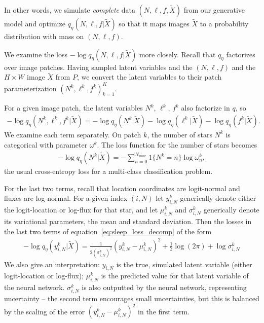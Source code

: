 In other words, we simulate {\itshape complete} data $(N, \ell, f, \tilde X)$ from our generative model and optimize $q_{\eta}(N, \ell, f | \tilde X)$ so that it maps images $\tilde X$ to a probability distribution with mass on $(N, \ell, f)$.

We examine the loss $-\log q_\eta(N, \ell, f | \tilde X)$ more closely. Recall that $q_\eta$ factorizes over image patches. Having sampled latent variables and the $(N,\ell,f)$ and the $H\times W$ image $\tilde X$ from $P$, we convert the latent variables to their patch parameterization $(N^k, \ell^k, f^k)_{k = 1}^K$. 

For a given image patch, the latent variables $N^k$, $\ell^k$, $f^k$ also factorize in $q$, so 
\begin{align}
    - \log q_\eta(N^k, \ell^k, f^k | \tilde X) = 
        - \log q_\eta(N^k | \tilde X) 
        - \log q_\eta(\ell^k | \tilde X) 
        - \log q_\eta(f^k | \tilde X). 
        \label{eq:sleep_loss_decomp}
\end{align}
We examine each term separately. On patch $k$, the number of stars $N^k$ is categorical with parameter $\omega^k$. The loss function for the number of stars becomes
\begin{align}
    - \log q_\eta(N^k | \tilde X) = -\sum_{n = 0}^{N_{max}} 1\{N^k = n\} \log \omega^k_n, 
\end{align}
the usual cross-entropy loss for a multi-class classification problem. 

For the last two terms, recall that location coordinates are logit-normal and fluxes are log-normal. For a given index $(i, N)$ let $y^k_{i,N}$ generically denote either the 
logit-location or log-flux for that star, 
and let $\mu^k_{i,N}$ and $\sigma^{k}_{i,N}$ generically denote its variational parameters,
the mean and standard deviation. Then the losses in the last two terms of equation~\ref{eq:sleep_loss_decomp}
of the form 
\begin{align}
    -\log q_\eta(y^k_{i,N} | \tilde X) = 
        \frac{1}{2(\sigma^{k}_{i,N})^2}(y^k_{i,N} - \mu^k_{i,N})^2 + \frac{1}{2}\log(2\pi) + \log\sigma^{k}_{i,N}
\end{align}
We also give an interpretation: $y_{i,N}$ is the true, simulated latent variable (either logit-location or log-flux); $\mu^k_{i,N}$ is the predicted value for that latent variable of the neural network. $\sigma^{k}_{i,N}$ is also outputted by the neural network, representing uncertainty -- the second term encourages small uncertainties, but this is 
balanced by the scaling of the error $(y^k_{i,N} - \mu^k_{i,N})^2$ in the first term. 

